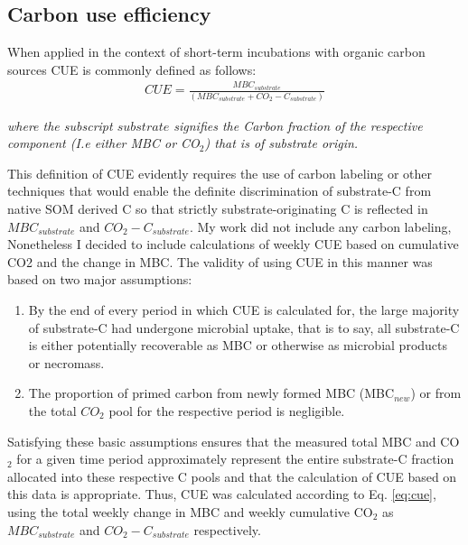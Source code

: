 \documentclass[12pt]{report}
\begin{document}
    \subsection{Carbon use efficiency}
    	
		When applied in the context of short-term incubations with organic carbon sources CUE is commonly defined as follows:\\

		\begin{align}
		CUE = \frac{MBC_{substrate}}{(MBC_{substrate} + CO_2-C_{substrate})}\label{eq:cue}
		\end{align}
  	 	
  	 	\begin{adjustwidth}{50pt}{50pt}
  	 		\begin{footnotesize}
  	 			\textit{where the subscript $ substrate $ signifies the Carbon fraction of the respective component (I.e either MBC or CO$ _2 $) that is of substrate origin. 
  	 			}\\
  	 		\end{footnotesize}
  	 	\end{adjustwidth} 
    	This definition of CUE evidently requires the use of carbon labeling or other techniques that would enable the definite discrimination of substrate-C from native SOM derived C so that strictly substrate-originating C is reflected in $ MBC_{substrate} $ and $ CO_2-C_{substrate} $.
    	My work did not include any carbon labeling, Nonetheless I decided to include calculations of weekly CUE based on cumulative CO2 and the change in MBC. The validity of using CUE in this manner was based on two major assumptions:\\
    	\begin{enumerate}
    		\item By the end of every period in which CUE is calculated for, the large majority of substrate-C had undergone microbial uptake, that is to say, all substrate-C is either potentially recoverable as MBC or otherwise as microbial products or necromass.
    		\item The proportion of primed carbon from newly formed MBC (MBC$ _{new} $) or from the total $ CO_2 $ pool for the respective period is negligible. 
    	\end{enumerate}
    	Satisfying these basic assumptions ensures that the measured total MBC and CO$ _2 $  for a given time period approximately represent the entire substrate-C fraction allocated into these respective C pools and that the calculation of CUE based on this data is appropriate. Thus, CUE was calculated according to Eq. \ref{eq:cue}, using the total weekly change in MBC and weekly cumulative CO$ _2 $ as  $MBC_{substrate} $ and $ CO_2-C_{substrate} $ respectively. 
    	
\end{document}
